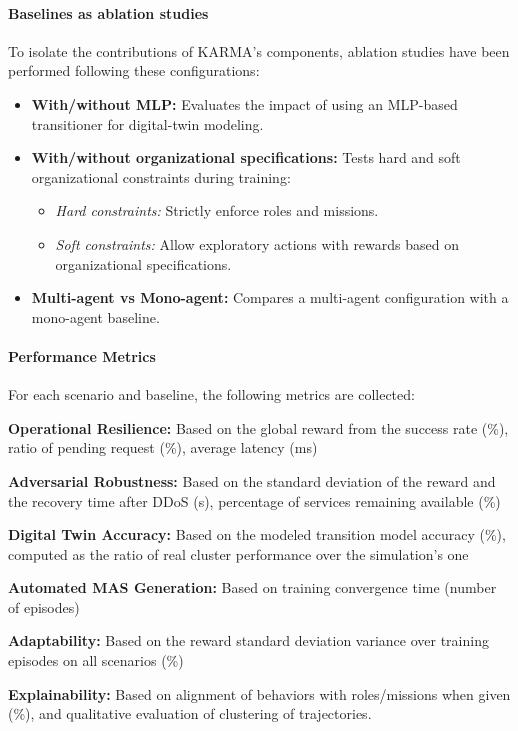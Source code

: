 \paragraph{\textbf{Baselines as ablation studies}}

\noindent To isolate the contributions of KARMA's components, ablation studies have been performed following these configurations:
%
\begin{itemize}
  \item \textbf{With/without MLP:} Evaluates the impact of using an MLP-based transitioner for digital-twin modeling.
  \item \textbf{With/without organizational specifications:} Tests hard and soft organizational constraints during training:
        \begin{itemize}
          \item \textit{Hard constraints:} Strictly enforce roles and missions.
          \item \textit{Soft constraints:} Allow exploratory actions with rewards based on organizational specifications.
        \end{itemize}
  \item \textbf{Multi-agent vs Mono-agent:} Compares a multi-agent configuration with a mono-agent baseline.
\end{itemize}

\paragraph{\textbf{Performance Metrics}}

\noindent For each scenario and baseline, the following metrics are collected:
%
\begin{enumerate*}[label=\textbf{\arabic*)}, itemjoin={;\quad }]
  \item \textbf{Operational Resilience:} Based on the global reward from the success rate (\%), ratio of pending request (\%), average latency (ms)
  \item \textbf{Adversarial Robustness:} Based on the standard deviation of the reward and the recovery time after DDoS (s), percentage of services remaining available (\%)
  \item \textbf{Digital Twin Accuracy:} Based on the modeled transition model accuracy (\%), computed as the ratio of real cluster performance over the simulation's one
  \item \textbf{Automated MAS Generation:} Based on training convergence time (number of episodes)
  \item \textbf{Adaptability:} Based on the reward standard deviation variance over training episodes on all scenarios (\%)
  \item \textbf{Explainability:} Based on alignment of behaviors with roles/missions when given (\%), and qualitative evaluation of clustering of trajectories.
\end{enumerate*}



